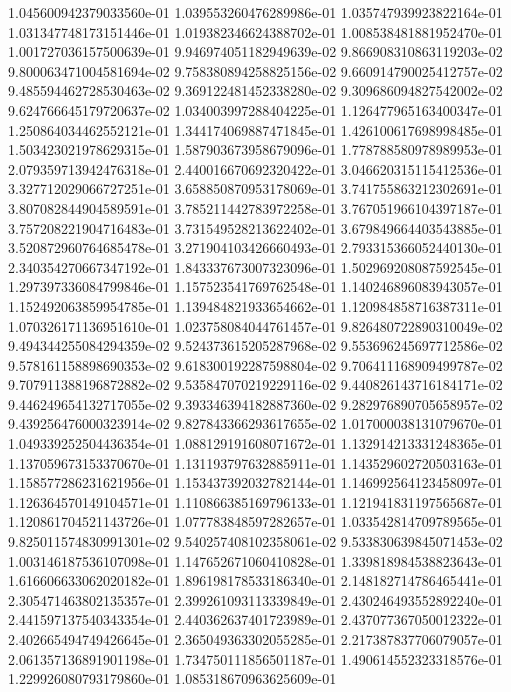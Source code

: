 1.045600942379033560e-01
1.039553260476289986e-01
1.035747939923822164e-01
1.031347748173151446e-01
1.019382346624388702e-01
1.008538481881952470e-01
1.001727036157500639e-01
9.946974051182949639e-02
9.866908310863119203e-02
9.800063471004581694e-02
9.758380894258825156e-02
9.660914790025412757e-02
9.485594462728530463e-02
9.369122481452338280e-02
9.309686094827542002e-02
9.624766645179720637e-02
1.034003997288404225e-01
1.126477965163400347e-01
1.250864034462552121e-01
1.344174069887471845e-01
1.426100617698998485e-01
1.503423021978629315e-01
1.587903673958679096e-01
1.778788580978989953e-01
2.079359713942476318e-01
2.440016670692320422e-01
3.046620315115412536e-01
3.327712029066727251e-01
3.658850870953178069e-01
3.741755863212302691e-01
3.807082844904589591e-01
3.785211442783972258e-01
3.767051966104397187e-01
3.757208221904716483e-01
3.731549528213622402e-01
3.679849664403543885e-01
3.520872960764685478e-01
3.271904103426660493e-01
2.793315366052440130e-01
2.340354270667347192e-01
1.843337673007323096e-01
1.502969208087592545e-01
1.297397336084799846e-01
1.157523541769762548e-01
1.140246896083943057e-01
1.152492063859954785e-01
1.139484821933654662e-01
1.120984858716387311e-01
1.070326171136951610e-01
1.023758084044761457e-01
9.826480722890310049e-02
9.494344255084294359e-02
9.524373615205287968e-02
9.553696245697712586e-02
9.578161158898690353e-02
9.618300192287598804e-02
9.706411168909499787e-02
9.707911388196872882e-02
9.535847070219229116e-02
9.440826143716184171e-02
9.446249654132717055e-02
9.393346394182887360e-02
9.282976890705658957e-02
9.439256476000323914e-02
9.827843366293617655e-02
1.017000038131079670e-01
1.049339252504436354e-01
1.088129191608071672e-01
1.132914213331248365e-01
1.137059673153370670e-01
1.131193797632885911e-01
1.143529602720503163e-01
1.158577286231621956e-01
1.153437392032782144e-01
1.146992564123458097e-01
1.126364570149104571e-01
1.110866385169796133e-01
1.121941831197565687e-01
1.120861704521143726e-01
1.077783848597282657e-01
1.033542814709789565e-01
9.825011574830991301e-02
9.540257408102358061e-02
9.533830639845071453e-02
1.003146187536107098e-01
1.147652671060410828e-01
1.339818984538823643e-01
1.616606633062020182e-01
1.896198178533186340e-01
2.148182714786465441e-01
2.305471463802135357e-01
2.399261093113339849e-01
2.430246493552892240e-01
2.441597137540343354e-01
2.440362637401723989e-01
2.437077367050012322e-01
2.402665494749426645e-01
2.365049363302055285e-01
2.217387837706079057e-01
2.061357136891901198e-01
1.734750111856501187e-01
1.490614552323318576e-01
1.229926080793179860e-01
1.085318670963625609e-01
